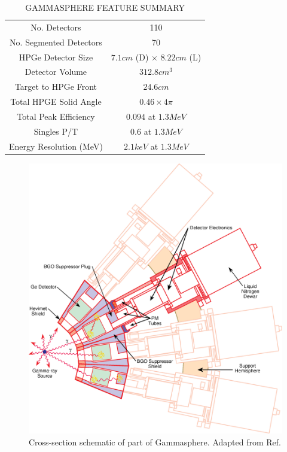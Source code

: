 \begin{table}[ht!]
\caption{GAMMASPHERE FEATURE SUMMARY\label{tbl:gs-summary}}
\begin{center}
\begin{tabular}{|c|c|}
\toprule
No. Detectors             & 110 \\ 
No. Segmented Detectors   & 70 \\ 
HPGe Detector Size        & $7.1 cm$ (D) $\times$ $8.22 cm$ (L) \\
Detector Volume           & $312.8 cm^3$\\
Target to HPGe Front      & $24.6 cm$\\ 
Total HPGE Solid Angle    & $0.46 \times 4\pi$\\ 
Total Peak Efficiency     & $0.094$ at $1.3 MeV$\\ 
Singles P/T               & $0.6$ at $1.3 MeV$ \\ 
Energy Resolution (MeV)   & $2.1keV$ at $1.3 MeV$ \\ 
\bottomrule
\end{tabular}
\end{center}
\end{table}

\begin{figure}[h]
	\centerline{\includegraphics[height=0.3\textheight]{./img/c3/gammasphere_detector.eps}}
	\caption{Cross-section schematic of part of Gammasphere. Adapted from Ref.\cite{gsBooklet}}
	\label{fig:chp3-gs_det_schem}
\end{figure}

